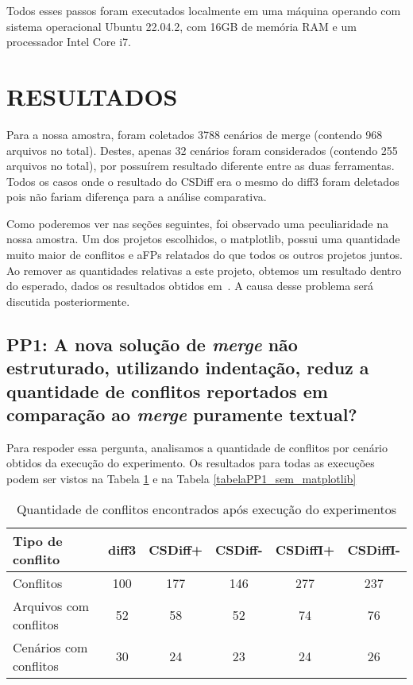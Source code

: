 Todos esses passos foram executados localmente em uma máquina operando com sistema operacional Ubuntu 22.04.2,
com 16GB de memória
RAM e um processador Intel Core i7.

\section{RESULTADOS}
Para a nossa amostra, foram coletados 3788 cenários de merge (contendo 968 arquivos
no total). Destes, apenas 32 cenários foram considerados (contendo 255 arquivos no total), por possuírem resultado
diferente entre as duas ferramentas. Todos os casos onde o resultado do CSDiff era o mesmo do diff3
foram deletados pois não fariam
diferença para a análise comparativa.

Como poderemos ver nas seções seguintes, foi observado uma peculiaridade na nossa amostra. Um dos projetos escolhidos, o
matplotlib, possui uma quantidade muito maior de conflitos e aFPs relatados do que todos os outros projetos juntos. Ao remover
as quantidades relativas a este projeto, obtemos um resultado dentro do esperado, dados os resultados obtidos
em~\cite{clem21,heitor21}. A causa desse problema será discutida posteriormente.

\subsection{PP1: A nova solução de \emph{merge} não estruturado, utilizando indentação,
	reduz a quantidade de conflitos reportados em comparação ao \emph{merge} puramente textual?}
Para respoder essa pergunta, analisamos a quantidade de conflitos por cenário obtidos da execução do experimento. Os
resultados para todas as execuções podem ser vistos na Tabela \ref{tabelaPP1_com_matplotlib} e na
Tabela \ref{tabelaPP1_sem_matplotlib}

\begin{table}[ht]
	\begin{center}
		\begin{tabular}{|l|c|c|c|c|c|}
			\hline
			\textbf{Tipo de conflito} & \textbf{diff3} & \textbf{CSDiff+} & \textbf{CSDiff-} & \textbf{CSDiffI+} & \textbf{CSDiffI-} \\
			\hline
			Conflitos                 & 100            & 177              & 146              & 277               & 237               \\
			Arquivos com conflitos    & 52             & 58               & 52               & 74                & 76                \\
			Cenários com conflitos    & 30             & 24               & 23               & 24                & 26                \\
			\hline
		\end{tabular}
	\end{center}
	\caption{Quantidade de conflitos encontrados após execução do experimentos}\label{tabelaPP1_com_matplotlib}
\end{table}

